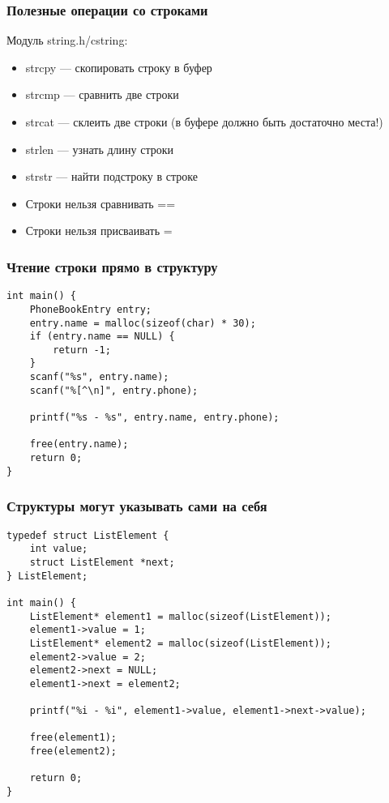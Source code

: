 \documentclass{../../slides-style}
\begin{document}
    \begin{frame}
        \frametitle{Полезные операции со строками}
        Модуль string.h/cstring:
        \begin{itemize}
            \item strcpy --- скопировать строку в буфер
            \item strcmp --- сравнить две строки
            \item strcat --- склеить две строки (в буфере должно быть достаточно места!)
            \item strlen --- узнать длину строки
            \item strstr --- найти подстроку в строке
            \item Строки нельзя сравнивать ==
            \item Строки нельзя присваивать =
        \end{itemize}
    \end{frame}

    \begin{frame}[fragile]
        \frametitle{Чтение строки прямо в структуру}
        \begin{verbatim}
int main() {
    PhoneBookEntry entry;
    entry.name = malloc(sizeof(char) * 30);
    if (entry.name == NULL) {
        return -1;
    }
    scanf("%s", entry.name);
    scanf("%[^\n]", entry.phone);

    printf("%s - %s", entry.name, entry.phone);

    free(entry.name);
    return 0;
}
        \end{verbatim}
    \end{frame}

    \begin{frame}[fragile]
        \frametitle{Структуры могут указывать сами на себя}
        \begin{footnotesize}
            \begin{verbatim}
typedef struct ListElement {
    int value;
    struct ListElement *next;
} ListElement;

int main() {
    ListElement* element1 = malloc(sizeof(ListElement));
    element1->value = 1;
    ListElement* element2 = malloc(sizeof(ListElement));
    element2->value = 2;
    element2->next = NULL;
    element1->next = element2;

    printf("%i - %i", element1->value, element1->next->value);

    free(element1);
    free(element2);

    return 0;
}
            \end{verbatim}
        \end{footnotesize}
    \end{frame}
\end{document}
